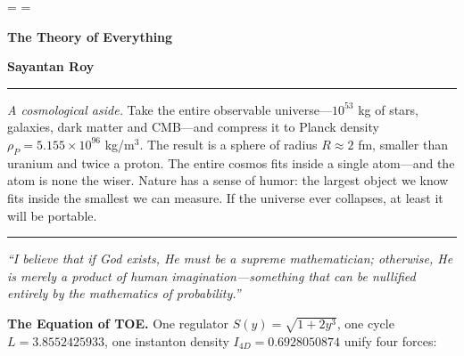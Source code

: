 \documentclass[a4paper,7pt,oneside,openany]{book}
\begin{document}
\pagestyle{plain}
\sloppy
\hfuzz=\maxdimen
\vfuzz=\maxdimen

\begin{titlepage}
\centering
{}

\vspace*{1.2cm}

{\Huge\bfseries The Theory of Everything\par}
\vspace{0.3cm}


\vspace{0.8cm}
{\Large\bfseries Sayantan Roy\par}

\vspace{0.8cm}
\rule{0.7\textwidth}{0.6pt}

\vspace{0.8cm}
\begin{minipage}{0.82\textwidth}
\centering
\footnotesize\textit{A cosmological aside.} Take the entire observable universe---$10^{53}$ kg of stars, galaxies, dark matter and CMB---and compress it to Planck density $\rho_P=5.155\times10^{96}$ kg/m$^3$. The result is a sphere of radius $R\approx2$ fm, smaller than uranium and twice a proton. The entire cosmos fits inside a single atom---and the atom is none the wiser. Nature has a sense of humor: the largest object we know fits inside the smallest we can measure. If the universe ever collapses, at least it will be portable.
\end{minipage}
\vspace{0.8cm}
\rule{0.7\textwidth}{0.6pt}

\vspace{0.8cm}
\begin{minipage}{0.8\textwidth}
\centering
\small\itshape
``I believe that if God exists, He must be a supreme mathematician; otherwise, He is merely a product of human imagination---something that can be nullified entirely by the mathematics of probability.''
\end{minipage}

\vspace{1.0cm}

\begin{minipage}{0.88\textwidth}
\centering
\small
\textbf{The Equation of TOE.} One regulator $S(y)=\sqrt{1+2y^3}$, one cycle $L=3.8552425933$, one instanton density $I_{4D}=0.6928050874$ unify four forces:


\end{minipage}
\end{titlepage}
\end{document}
